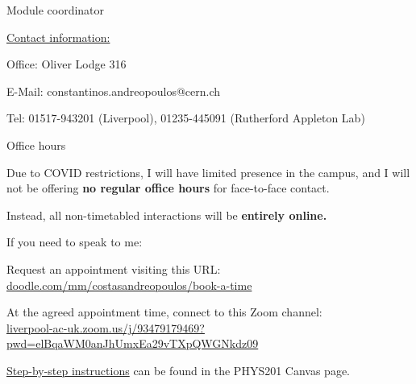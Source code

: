\begin{frame}{Module coordinator}
\vspace{0.6cm}

\underline{Contact information:}\\
\vspace{0.2cm}
\begin{itemize}
{\small
 \item Office: Oliver Lodge 316
 \item E-Mail: constantinos.andreopoulos@cern.ch
 \item Tel: 01517-943201 (Liverpool), 01235-445091 (Rutherford Appleton Lab)
}
\end{itemize}

\end{frame}

%
%
%

\begin{frame}{Office hours}

Due to COVID restrictions, I will have limited presence in the campus,
and I will not be offering {\bf no regular office hours} for face-to-face contact.\\

\vspace{0.2cm}

Instead, all non-timetabled interactions will be {\bf entirely online.}

\vspace{0.2cm}

If you need to speak to me:
\begin{itemize}
{\small
  \item Request an appointment visiting this URL:
  {\color{blue} \scriptsize \url{doodle.com/mm/costasandreopoulos/book-a-time}}
  \item At the agreed appointment time, connect to this Zoom channel:\\
  {\color{blue} \scriptsize \url{liverpool-ac-uk.zoom.us/j/93479179469?pwd=elBqaWM0anJhUmxEa29vTXpQWGNkdz09}}
}
\end{itemize}

\vspace{0.2cm}
\underline{Step-by-step instructions} can be found in the PHYS201 Canvas page.\\

\end{frame}


%
%

